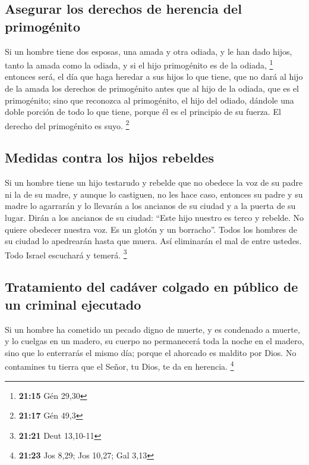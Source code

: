 \begin{paracol}{2}
{\subsection{Asegurar los derechos de herencia del
primogénito}\label{asegurar-los-derechos-de-herencia-del-primoguxe9nito}}

 Si un hombre tiene dos esposas, una amada y otra odiada,
y le han dado hijos, tanto la amada como la odiada, y si el hijo
primogénito es de la odiada, \footnote{\textbf{21:15} Gén 29,30}
 entonces será, el día que haga heredar a sus hijos lo
que tiene, que no dará al hijo de la amada los derechos de primogénito
antes que al hijo de la odiada, que es el primogénito; 
sino que reconozca al primogénito, el hijo del odiado, dándole una doble
porción de todo lo que tiene, porque él es el principio de su fuerza. El
derecho del primogénito es suyo. \footnote{\textbf{21:17} Gén 49,3}

\hypertarget{medidas-contra-los-hijos-rebeldes}{%
\subsection{Medidas contra los hijos
rebeldes}\label{medidas-contra-los-hijos-rebeldes}}

 Si un hombre tiene un hijo testarudo y rebelde que no
obedece la voz de su padre ni la de su madre, y aunque lo castiguen, no
les hace caso,  entonces su padre y su madre lo agarrarán
y lo llevarán a los ancianos de su ciudad y a la puerta de su lugar.
 Dirán a los ancianos de su ciudad: ``Este hijo nuestro
es terco y rebelde. No quiere obedecer nuestra voz. Es un glotón y un
borracho''.  Todos los hombres de su ciudad lo apedrearán
hasta que muera. Así eliminarán el mal de entre ustedes. Todo Israel
escuchará y temerá. \footnote{\textbf{21:21} Deut 13,10-11}

\hypertarget{tratamiento-del-caduxe1ver-colgado-en-puxfablico-de-un-criminal-ejecutado}{%
\subsection{Tratamiento del cadáver colgado en público de un criminal
ejecutado}\label{tratamiento-del-caduxe1ver-colgado-en-puxfablico-de-un-criminal-ejecutado}}

 Si un hombre ha cometido un pecado digno de muerte, y es
condenado a muerte, y lo cuelgas en un madero,  su cuerpo
no permanecerá toda la noche en el madero, sino que lo enterrarás el
mismo día; porque el ahorcado es maldito por Dios. No contamines tu
tierra que el Señor, tu Dios, te da en herencia. \footnote{\textbf{21:23}
  Jos 8,29; Jos 10,27; Gal 3,13}


\end{paracol}
